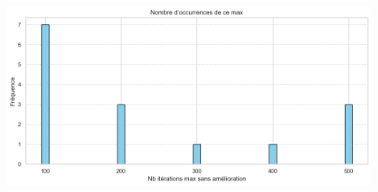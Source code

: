 \documentclass[french,nochapter,11pt]{rapportUB}
\begin{document}
\includegraphics[width=0.9\textwidth]{bestM.png}
\end{document}
